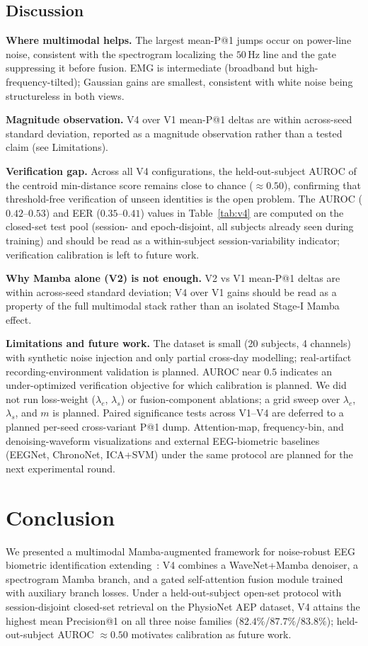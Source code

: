 \documentclass{IEEEtran}
\begin{document}
\subsection{Discussion}
\textbf{Where multimodal helps.} The largest mean-P@1 jumps occur on
power-line noise, consistent with the spectrogram localizing the
$50$\,Hz line and the gate suppressing it before fusion. EMG is
intermediate (broadband but high-frequency-tilted); Gaussian gains are
smallest, consistent with white noise being structureless in both views.

\textbf{Magnitude observation.} V4 over V1 mean-P@1 deltas are within
across-seed standard deviation, reported as a magnitude observation
rather than a tested claim (see Limitations).

\textbf{Verification gap.} Across all V4 configurations, the
held-out-subject AUROC of the centroid min-distance score remains close
to chance ($\approx 0.50$), confirming that threshold-free verification
of unseen identities is the open problem. The AUROC ($0.42$--$0.53$)
and EER ($0.35$--$0.41$) values in Table~\ref{tab:v4} are computed on
the closed-set test pool (session- and epoch-disjoint, all subjects
already seen during training) and should be read as a within-subject
session-variability indicator; verification calibration is left to
future work.

\textbf{Why Mamba alone (V2) is not enough.} V2 vs V1 mean-P@1 deltas
are within across-seed standard deviation; V4 over V1 gains should be
read as a property of the full multimodal stack rather than an isolated
Stage-I Mamba effect.

\textbf{Limitations and future work.} The dataset is small (20
subjects, 4 channels) with synthetic noise injection and only partial
cross-day modelling; real-artifact recording-environment validation is
planned. AUROC near $0.5$ indicates an under-optimized verification
objective for which calibration is planned. We did not run loss-weight
($\lambda_{e}$, $\lambda_{s}$) or fusion-component ablations; a grid
sweep over $\lambda_{e}$, $\lambda_{s}$, and $m$ is planned. Paired
significance tests across V1--V4 are deferred to a planned per-seed
cross-variant P@1 dump. Attention-map, frequency-bin, and
denoising-waveform visualizations and external EEG-biometric baselines
(EEGNet, ChronoNet, ICA+SVM) under the same protocol are planned for
the next experimental round.

\section{Conclusion}
We presented a multimodal Mamba-augmented framework for noise-robust EEG
biometric identification extending~\cite{b1}: V4 combines a WaveNet+Mamba
denoiser, a spectrogram Mamba branch, and a gated self-attention fusion
module trained with auxiliary branch losses. Under a held-out-subject
open-set protocol with session-disjoint closed-set retrieval on the
PhysioNet AEP dataset, V4 attains the highest mean Precision@1 on all
three noise families ($82.4\%$/$87.7\%$/$83.8\%$); held-out-subject
AUROC $\approx 0.50$ motivates calibration as future work.
\end{document}
